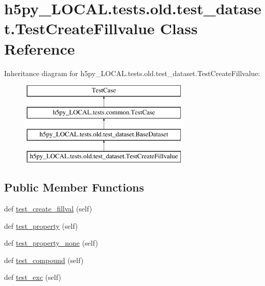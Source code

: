 \hypertarget{classh5py__LOCAL_1_1tests_1_1old_1_1test__dataset_1_1TestCreateFillvalue}{}\section{h5py\+\_\+\+L\+O\+C\+A\+L.\+tests.\+old.\+test\+\_\+dataset.\+Test\+Create\+Fillvalue Class Reference}
\label{classh5py__LOCAL_1_1tests_1_1old_1_1test__dataset_1_1TestCreateFillvalue}
Inheritance diagram for h5py\+\_\+\+L\+O\+C\+A\+L.\+tests.\+old.\+test\+\_\+dataset.\+Test\+Create\+Fillvalue\+:\begin{figure}[H]
\begin{center}
\leavevmode
\includegraphics[height=4.000000cm]{classh5py__LOCAL_1_1tests_1_1old_1_1test__dataset_1_1TestCreateFillvalue}
\end{center}
\end{figure}
\subsection*{Public Member Functions}
\begin{DoxyCompactItemize}
\item 
def \hyperlink{classh5py__LOCAL_1_1tests_1_1old_1_1test__dataset_1_1TestCreateFillvalue_a0dd6f0afe71e119bf362c48ccbf6dfc3}{test\+\_\+create\+\_\+fillval} (self)
\item 
def \hyperlink{classh5py__LOCAL_1_1tests_1_1old_1_1test__dataset_1_1TestCreateFillvalue_a0e5ed7a91613e163f304acf2d5166960}{test\+\_\+property} (self)
\item 
def \hyperlink{classh5py__LOCAL_1_1tests_1_1old_1_1test__dataset_1_1TestCreateFillvalue_a085fdc8252ee9fa7d2961901dd303bd1}{test\+\_\+property\+\_\+none} (self)
\item 
def \hyperlink{classh5py__LOCAL_1_1tests_1_1old_1_1test__dataset_1_1TestCreateFillvalue_a0cff1060c349081160c3d730c0107011}{test\+\_\+compound} (self)
\item 
def \hyperlink{classh5py__LOCAL_1_1tests_1_1old_1_1test__dataset_1_1TestCreateFillvalue_a7cc8e2b8ef8b416535a11f6e362c2ba5}{test\+\_\+exc} (self)
\end{DoxyCompactItemize}
